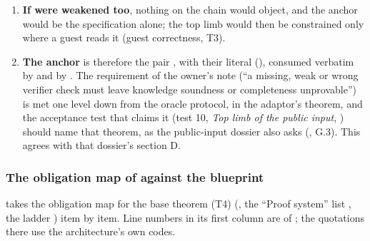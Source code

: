 \begin{sloppypar}
\begin{enumerate}
\item \textbf{If  were weakened too}, nothing on the chain would object,
  and the anchor would be the specification alone; the top limb would then be constrained only
  where a guest reads it (guest correctness, T3).
\item \textbf{The anchor} is therefore the pair ,
   with their literal  (), consumed
  verbatim by  and by . The requirement of the owner's
  note (\enquote{a missing, weak or wrong verifier check must leave knowledge soundness or
  completeness unprovable}) is met one level down from the oracle protocol, in the adaptor's
  theorem, and the acceptance test that claims it (test 10, \emph{Top limb of the public input},
  ) should name that theorem, as the public-input dossier also asks
  (, G.3). This agrees with that dossier's section D.
\end{enumerate}
\end{sloppypar}

\subsubsection{The obligation map of \texorpdfstring{\protect{}}{docs/architecture.md} against the blueprint}\label{sec:gen-boundary-architecture}

 takes the obligation map for the base theorem (T4)
(, the \enquote{Proof system} list ,
the ladder ) item by item. Line numbers in its first column are of
; the quotations there use the architecture's own codes.

